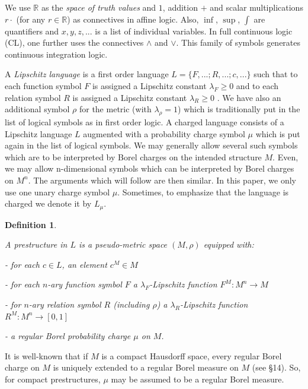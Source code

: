 \documentclass[12pt]{article}
\newtheorem{definition}[theorem]{Definition}
\def\Rn{\mathbb R}
\begin{document}
We use $\Rn$ as the \emph{space of truth values} and $1$, addition $+$ and scalar multiplications $r\cdot$
(for any $r\in\Rn$) as connectives in affine logic.
Also, $\inf$, $\sup$, $\int$ are quantifiers and $x,y,z,...$ is a list of individual variables.
In full continuous logic (CL), one further uses the connectives $\wedge$ and $\vee$.
This family of symbols generates continuous integration logic.

A {\em Lipschitz language} is a first order language $L=\{F,...; R,...; c,...\}$
such that to each function symbol $F$ is assigned a Lipschitz constant $\lambda_F\geqslant0$
and to each relation symbol $R$ is assigned a Lipschitz constant $\lambda_R\geqslant0$ .
We have also an additional symbol $\rho$ for the metric (with $\lambda_{\rho}=1$)
which is traditionally put in the list of logical symbols as in first order logic.
A charged language consists of a Lipschitz language $L$ augmented with a probability charge symbol $\mu$
which is put again in the list of logical symbols. We may generally allow several such symbols which
are to be interpreted by Borel charges on the intended structure $M$.
Even, we may allow n-dimensional symbols which can be interpreted by Borel charges on $M^n$.
The arguments which will follow are then similar.
In this paper, we only use one unary charge symbol $\mu$. Sometimes, to emphasize that the language is charged we denote it by $L_\mu$.

\begin{definition} \label{prestructure}
{\em A {\em prestructure} in $L$ is a pseudo-metric space $(M,\rho)$ equipped with:

- for each $c\in L$, an element $c^{M}\in M$

- for each $n$-ary function symbol $F$ a $\lambda_F$-Lipschitz function
$F^{M}:M^n\rightarrow M$

- for $n$-ary relation symbol $R$ (including $\rho$) a $\lambda_R$-Lipschitz function
$R^{M}:M^n\rightarrow[0,1]$

- a regular Borel probability charge $\mu$ on $M$.}
\end{definition}
\vspace{2mm}

It is well-known that if $M$ is a compact Hausdorff space, every regular Borel charge on
$M$ is uniquely extended to a regular Borel measure on $M$ (see \cite{Aliprantis-Inf} \S 14).
So, for compact prestructures, $\mu$ may be assumed to be a regular Borel measure.
\vspace{1mm}
\end{document}
